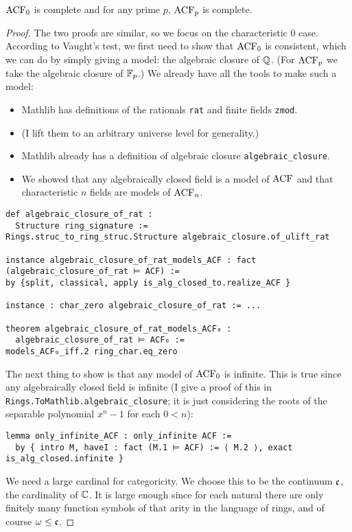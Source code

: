 \begin{prop}
  $\operatorname{ACF}_{0}$ is complete and for any prime $p$, $\operatorname{ACF}_{p}$ is complete.
\end{prop}
\begin{proof}
  The two proofs are similar, so we focus on the characteristic $0$ case.
  According to Vaught's test, we first need to show that $\operatorname{ACF}_{0}$ is consistent,
  which we can do by simply giving a model: the algebraic closure of $\mathbb{Q}$.
  (For $\operatorname{ACF}_{p}$ we take the algebraic closure of $\mathbb{F}_{p}$.)
  We already have all the tools to make such a model:
  \begin{itemize}
    \item Mathlib has definitions of the rationals \texttt{rat} and finite fields \texttt{zmod}.
    \item (I lift them to an arbitrary universe level for generality.)
    \item Mathlib already has a definition of algebraic closure \texttt{algebraic\_closure}.
    \item We showed that any algebraically closed field is a model of $\operatorname{ACF}$
          and that characteristic $n$ fields are models of $\operatorname{ACF}_{n}$.
  \end{itemize}
  \begin{lstlisting}
def algebraic_closure_of_rat :
  Structure ring_signature :=
Rings.struc_to_ring_struc.Structure algebraic_closure.of_ulift_rat

instance algebraic_closure_of_rat_models_ACF : fact (algebraic_closure_of_rat ⊨ ACF) :=
by {split, classical, apply is_alg_closed_to.realize_ACF }

instance : char_zero algebraic_closure_of_rat := ...

theorem algebraic_closure_of_rat_models_ACF₀ :
  algebraic_closure_of_rat ⊨ ACF₀ :=
models_ACF₀_iff.2 ring_char.eq_zero \end{lstlisting}

The next thing to show is that any model of $\operatorname{ACF}_{0}$ is infinite.
This is true since any algebraically closed field is infinite
(I give a proof of this in \texttt{Rings.ToMathlib.algebraic\_closure};
it is just considering the roots of the separable polynomial $x^{n} - 1$ for each $0 < n$):
\begin{lstlisting}
lemma only_infinite_ACF : only_infinite ACF :=
  by { intro M, haveI : fact (M.1 ⊨ ACF) := ⟨ M.2 ⟩, exact is_alg_closed.infinite }\end{lstlisting}

We need a large cardinal for categoricity.
We choose this to be the continuum $\mathfrak{c}$, the cardinality of $\mathbb{C}$.
It is large enough since for each natural there are only finitely many function symbols
of that arity in the language of rings, and of course $\omega \le \mathfrak{c}$.


\end{proof}
